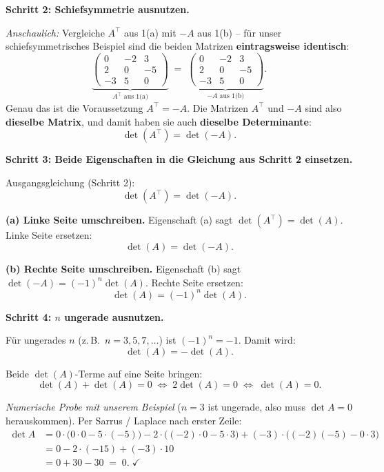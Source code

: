 \documentclass[a4paper,12pt]{article}
\begin{document}
\medskip

\textbf{Schritt 2: Schiefsymmetrie ausnutzen.}

\emph{Anschaulich:} Vergleiche $A^\top$ aus 1(a) mit $-A$ aus 1(b) -- f\"ur unser schiefsymmetrisches Beispiel sind die beiden Matrizen \textbf{eintragsweise identisch}:
\[
\underbrace{\begin{pmatrix} 0 & -2 & 3 \\ 2 & 0 & -5 \\ -3 & 5 & 0 \end{pmatrix}}_{A^\top \text{ aus 1(a)}}
\;=\;
\underbrace{\begin{pmatrix} 0 & -2 & 3 \\ 2 & 0 & -5 \\ -3 & 5 & 0 \end{pmatrix}}_{-A \text{ aus 1(b)}}.
\]
Genau das ist die Voraussetzung $A^\top = -A$. Die Matrizen $A^\top$ und $-A$ sind also \textbf{dieselbe Matrix}, und damit haben sie auch \textbf{dieselbe Determinante}:
\[
\det(A^\top) = \det(-A).
\]

\textbf{Schritt 3: Beide Eigenschaften in die Gleichung aus Schritt 2 einsetzen.}

Ausgangsgleichung (Schritt 2):
\[
\det(A^\top) = \det(-A).
\]

\textbf{(a) Linke Seite umschreiben.} Eigenschaft (a) sagt $\det(A^\top) = \det(A)$. Linke Seite ersetzen:
\[
\det(A) = \det(-A).
\]

\textbf{(b) Rechte Seite umschreiben.} Eigenschaft (b) sagt $\det(-A) = (-1)^n \det(A)$. Rechte Seite ersetzen:
\[
\det(A) = (-1)^n \det(A).
\]

\medskip

\textbf{Schritt 4: $n$ ungerade ausnutzen.}

F\"ur ungerades $n$ (z.\,B.\ $n = 3, 5, 7, \dots$) ist $(-1)^n = -1$. Damit wird:
\[
\det(A) = -\det(A).
\]

Beide $\det(A)$-Terme auf eine Seite bringen:
\[
\det(A) + \det(A) = 0 \;\Longleftrightarrow\; 2 \det(A) = 0 \;\Longleftrightarrow\; \det(A) = 0.
\]

\emph{Numerische Probe mit unserem Beispiel} ($n = 3$ ist ungerade, also muss $\det A = 0$ herauskommen). Per Sarrus / Laplace nach erster Zeile:
\begin{align*}
\det A &= 0 \cdot \bigl(0 \cdot 0 - 5 \cdot (-5)\bigr) - 2 \cdot \bigl((-2) \cdot 0 - 5 \cdot 3\bigr) + (-3) \cdot \bigl((-2)(-5) - 0 \cdot 3\bigr) \\
&= 0 - 2 \cdot (-15) + (-3) \cdot 10 \\
&= 0 + 30 - 30 \;=\; 0. \;\checkmark
\end{align*}
\end{document}
